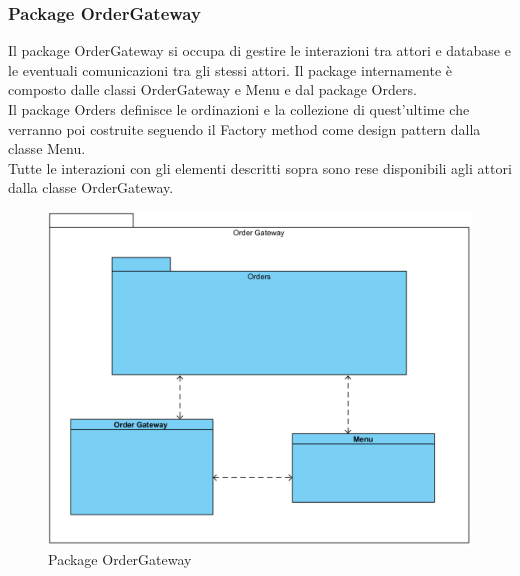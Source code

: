\subsubsection{Package Order\-Gateway}
Il package Order\-Gateway si occupa di gestire le interazioni tra attori e database e le eventuali comunicazioni tra gli stessi attori. Il package internamente è composto dalle classi Order\-Gateway e Menu e dal package Orders.\\
Il package Orders definisce le ordinazioni e la collezione di quest'ultime che verranno poi costruite seguendo il Factory method come design pattern dalla classe Menu.\\
Tutte le interazioni con gli elementi descritti sopra sono rese disponibili agli attori dalla classe Order\-Gateway.
\begin{figure}[H]
	\centering
	\includegraphics[width=14cm]{diagrammi_img/classi_e_package/ordergate.png}
	\caption{Package Order\-Gateway}
\end{figure}

